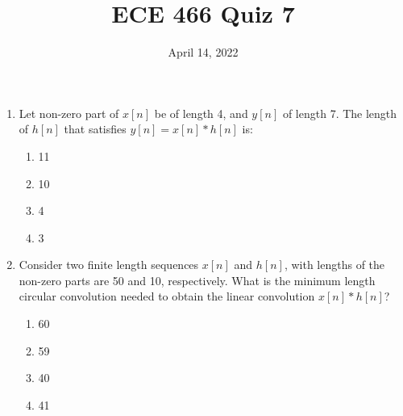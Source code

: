 \documentclass{article}
\date{April 14, 2022}
\begin{document}
 
\title{ECE 466 Quiz 7}
 
\maketitle
 
\begin{enumerate}

    \item Let non-zero part of $x[n]$ be of length 4, and $y[n]$ of length 7. The length of $h[n]$ that satisfies $y[n] = x[n] \ast h[n]$ is:
    \begin{enumerate}
        \item 11
        \item 10
        \item 4
        \item 3
    \end{enumerate}
    
    \item Consider two finite length sequences $x[n]$ and $h[n]$, with lengths of the non-zero parts are 50 and 10, respectively. What is the minimum length circular convolution needed to obtain the linear convolution $x[n]\ast h[n]$?
    \begin{enumerate}
        \item 60
        \item 59
        \item 40
        \item 41
    \end{enumerate}

\end{enumerate}
\end{document}

